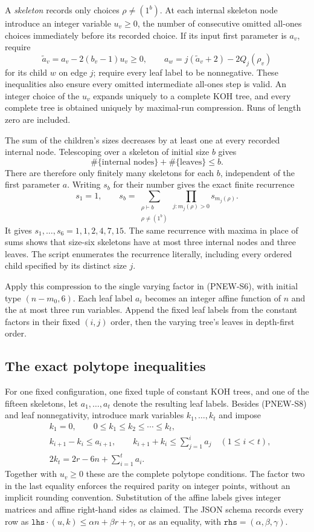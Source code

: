 A \emph{skeleton} records only choices $\rho\ne(1^b)$.
At each internal skeleton node introduce an integer variable
$u_v\ge0$, the number of consecutive omitted all-ones choices
immediately before its recorded choice.  If its input first
parameter is $a_v$, require
\[
 \widetilde a_v=a_v-2(b_v-1)u_v\ge0,
 \qquad
 a_w=j(\widetilde a_v+2)-2Q_j(\rho_v)
 \tag{PNEW-S8}
\]
for its child $w$ on edge $j$; require every leaf label to
be nonnegative.  These inequalities also ensure every omitted
intermediate all-ones step is valid.  An integer choice of
the $u_v$ expands uniquely to a complete KOH tree, and every
complete tree is obtained uniquely by maximal-run compression.
Runs of length zero are included.

The sum of the children's sizes decreases by at least one
at every recorded internal node.  Telescoping over a skeleton
of initial size $b$ gives
\[
 \#\{\text{internal nodes}\}+\#\{\text{leaves}\}\le b.
 \tag{PNEW-S9}
\]
There are therefore only finitely many skeletons for each $b$,
independent of the first parameter $a$.
Writing $s_b$ for their number gives the exact finite recurrence
\[
 s_1=1,\qquad
 s_b=\sum_{\substack{\rho\vdash b\\\rho\ne(1^b)}}
                   \prod_{j:m_j(\rho)>0}s_{m_j(\rho)}.
 \tag{PNEW-S10}
\]
It gives $s_1,\ldots,s_6=1,1,2,4,7,15$.
The same recurrence with maxima in place of sums shows that
size-six skeletons have at most three internal nodes and
three leaves.  The script enumerates the recurrence literally,
including every ordered child specified by its distinct size $j$.

Apply this compression to the single varying factor in
(PNEW-S6), with initial type $(n-m_0,6)$.  Each leaf label
$a_i$ becomes an integer affine function of $n$ and the
at most three run variables.  Append the fixed leaf labels
from the constant factors in their fixed $(i,j)$ order,
then the varying tree's leaves in depth-first order.

\subsection{The exact polytope inequalities}
For one fixed configuration, one fixed tuple of constant
KOH trees, and one of the fifteen skeletons, let
$a_1,\ldots,a_t$ denote the resulting leaf labels.
Besides (PNEW-S8) and leaf nonnegativity, introduce mark
variables $k_1,\ldots,k_t$ and impose
\[
 \begin{split}
 &k_1=0,\qquad 0\le k_1\le k_2\le\cdots\le k_t,\\
 &k_{i+1}-k_i\le a_{i+1},\qquad
   k_{i+1}+k_i\le\sum_{j=1}^{i}a_j\quad(1\le i<t),\\
 &2k_t=2r-6n+\sum_{i=1}^{t}a_i.
 \end{split}
 \tag{PNEW-S11}
\]
Together with $u_v\ge0$ these are the complete polytope
conditions.  The factor two in the last equality enforces
the required parity on integer points, without an implicit
rounding convention.  Substitution of the affine labels gives
integer matrices and affine right-hand sides as claimed.
The JSON schema records every row as
$\texttt{lhs}\cdot(u,k)\le\alpha n+\beta r+\gamma$, or
as an equality, with $\texttt{rhs}=(\alpha,\beta,\gamma)$.

